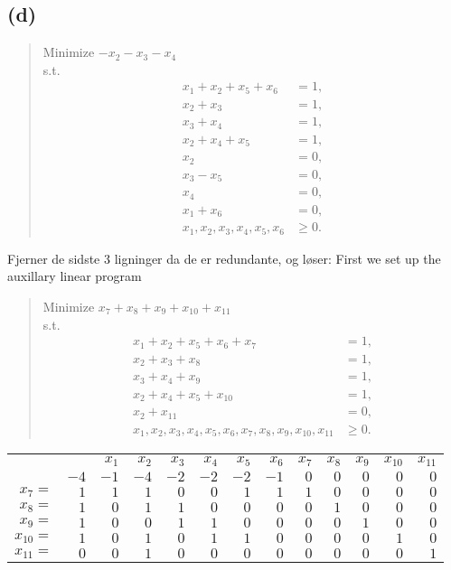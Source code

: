 \documentclass{article}
\theoremstyle{definition}
\begin{document}
\subsection*{(d)}
\begin{quote}
  Minimize $-x_2-x_3-x_4$ \\
  s.t.
  \begin{align*}
    x_1+x_2+x_5+x_6 &= 1, \\
    x_2+x_3 &= 1, \\
    x_3+x_4 &= 1, \\
    x_2+x_4+x_5 &= 1, \\
    x_2 &= 0, \\
    x_3-x_5 &= 0, \\
    x_4 &= 0, \\
    x_1+x_6 &= 0, \\
    x_1, x_2, x_3, x_4, x_5, x_6 &\geq 0.
  \end{align*}
\end{quote}
Fjerner de sidste 3 ligninger da de er redundante, og løser:
First we set up the auxillary linear program
\begin{quote}
  Minimize $x_7+x_8+x_9+x_10+x_11$ \\
  s.t.
  \begin{align*}
    x_1+x_2+x_5+x_6+x_7 &= 1, \\
    x_2+x_3+x_8 &= 1, \\
    x_3+x_4+x_9 &= 1, \\
    x_2+x_4+x_5+x_10 &= 1, \\
    x_2+x_11 &= 0, \\
    x_1, x_2, x_3, x_4, x_5, x_6, x_7, x_8, x_9, x_10, x_11 &\geq 0.
  \end{align*}
\end{quote}
\bgroup
\def\arraystretch{1.5}
\begin{table}[H]
  \begin{tabular}{r|r|rrrrrrrrrrr|}
  \cline{2-13}
    &   & $x_1$ & $x_2$ & $x_3$ & $x_4$ & $x_5$ & $x_6$ & $x_7$ & $x_8$ & $x_9$ & $x_10$ & $x_11$ \\ \cline{2-13}
    & $-4$ & $-1$ & $-4$ & $-2$ & $-2$ & $-2$ & $-1$ & $0$ & $0$ & $0$ & $0$ & $0$ \\ \cline{2-13}
  $x_7 = $ & $1$ & $1$ & $1$ & $0$ & $0$ & $1$ & $1$ & $1$ & $0$ & $0$ & $0$ & $0$ \\ 
  $x_8 = $ & $1$ & $0$ & $1$ & $1$ & $0$ & $0$ & $0$ & $0$ & $1$ & $0$ & $0$ & $0$ \\ 
  $x_9 = $ & $1$ & $0$ & $0$ & $1$ & $1$ & $0$ & $0$ & $0$ & $0$ & $1$ & $0$ & $0$ \\ 
  $x_10 = $ & $1$ & $0$ & $1$ & $0$ & $1$ & $1$ & $0$ & $0$ & $0$ & $0$ & $1$ & $0$ \\ 
  $x_11 = $ & $0$ & $0$ & $1$ & $0$ & $0$ & $0$ & $0$ & $0$ & $0$ & $0$ & $0$ & $1$ \\ \cline{2-13}
  \end{tabular}
\end{table}
\end{document}

